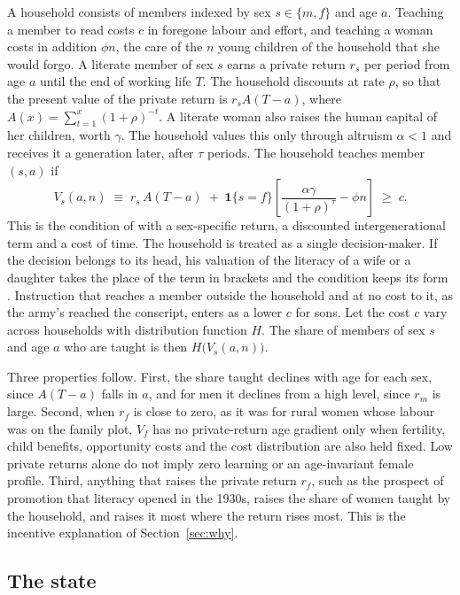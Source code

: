 A household consists of members indexed by sex $s\in\{m,f\}$ and age $a$. Teaching a member to read costs $c$ in foregone labour and effort, and teaching a woman costs in addition $\phi n$, the care of the $n$ young children of the household that she would forgo. A literate member of sex $s$ earns a private return $r_s$ per period from age $a$ until the end of working life $T$. The household discounts at rate $\rho$, so that the present value of the private return is $r_s A(T-a)$, where $A(x)=\sum_{t=1}^{x}(1+\rho)^{-t}$. A literate woman also raises the human capital of her children, worth $\gamma$. The household values this only through altruism $\alpha<1$ and receives it a generation later, after $\tau$ periods. The household teaches member $(s,a)$ if
\begin{equation}\label{eq:hh}
  V_s(a,n)\;\equiv\; r_s\,A(T-a) \;+\; \mathbf{1}\{s=f\}\left[\frac{\alpha\gamma}{(1+\rho)^{\tau}}-\phi n\right] \;\ge\; c .
\end{equation}
This is the condition of \citet{benporath1967} with a sex-specific return, a discounted intergenerational term and a cost of time. The household is treated as a single decision-maker. If the decision belongs to its head, his valuation of the literacy of a wife or a daughter takes the place of the term in brackets and the condition keeps its form \citep{doepke2009}. Instruction that reaches a member outside the household and at no cost to it, as the army's reached the conscript, enters as a lower $c$ for sons. Let the cost $c$ vary across households with distribution function $H$. The share of members of sex $s$ and age $a$ who are taught is then $H\big(V_s(a,n)\big)$.

Three properties follow. First, the share taught declines with age for each sex, since $A(T-a)$ falls in $a$, and for men it declines from a high level, since $r_m$ is large. Second, when $r_f$ is close to zero, as it was for rural women whose labour was on the family plot, $V_f$ has no private-return age gradient only when fertility, child benefits, opportunity costs and the cost distribution are also held fixed. Low private returns alone do not imply zero learning or an age-invariant female profile. Third, anything that raises the private return $r_f$, such as the prospect of promotion that literacy opened in the 1930s, raises the share of women taught by the household, and raises it most where the return rises most. This is the incentive explanation of Section~\ref{sec:why}.

\subsection{The state}

